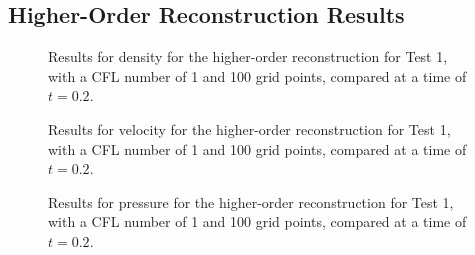 %		

\subsection{Higher-Order Reconstruction Results}
\begin{figure}
	\caption[Results for density for the higher-order reconstruction for Test 1, with a CFL number of 1 and 100 grid points, compared at a time of $t=0.2$.]{Results for density for the higher-order reconstruction for Test 1, with a CFL number of 1 and 100 grid points, compared at a time of $t=0.2$.}
	\label{fig:Test1HORdensity}
\end{figure}

\begin{figure}
	\caption[Results for velocity for the higher-order reconstruction for Test 1, with a CFL number of 1 and 100 grid points, compared at a time of $t=0.2$.]{Results for velocity for the higher-order reconstruction for Test 1, with a CFL number of 1 and 100 grid points, compared at a time of $t=0.2$.}
	\label{fig:Test1HORvelocity}
\end{figure}

\begin{figure}
	\caption[Results for pressure for the higher-order reconstruction for Test 1, with a CFL number of 1 and 100 grid points, compared at a time of $t=0.2$.]{Results for pressure for the higher-order reconstruction for Test 1, with a CFL number of 1 and 100 grid points, compared at a time of $t=0.2$.}
	\label{fig:Test1HORpressure}
\end{figure}

